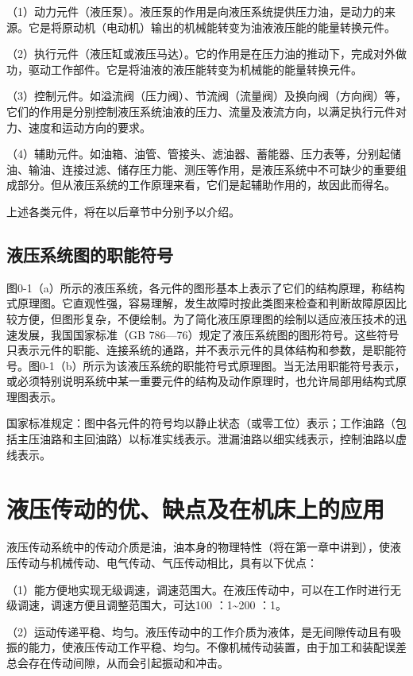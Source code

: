     （1）动力元件（液压泵）。液压泵的作用是向液压系统提供压力油，是动力的来源。它是将原动机（电动机）输出的机械能转变为油液液压能的能量转换元件。

    （2）执行元件（液压缸或液压马达）。它的作用是在压力油的推动下，完成对外做功，驱动工作部件。它是将油液的液压能转变为机械能的能量转换元件。

    （3）控制元件。如溢流阀（压力阀）、节流阀（流量阀）及换向阀（方向阀）等，它们的作用是分别控制液压系统油液的压力、流量及液流方向，以满足执行元件对力、速度和运动方向的要求。

    （4）辅助元件。如油箱、油管、管接头、滤油器、蓄能器、压力表等，分别起储油、输油、连接过滤、储存压力能、测压等作用，是液压系统中不可缺少的重要组成部分。但从液压系统的工作原理来看，它们是起辅助作用的，故因此而得名。

    上述各类元件，将在以后章节中分别予以介绍。

\subsection{液压系统图的职能符号}

    图0-1（a）所示的液压系统，各元件的图形基本上表示了它们的结构原理，称结构式原理图。它直观性强，容易理解，发生故障时按此类图来检查和判断故障原因比较方便，但图形复杂，不便绘制。为了简化液压原理图的绘制以适应液压技术的迅速发展，我国国家标准（GB 786—76）规定了液压系统图的图形符号。这些符号只表示元件的职能、连接系统的通路，并不表示元件的具体结构和参数，是职能符号。图0-1（b）所示为该液压系统的职能符号式原理图。当无法用职能符号表示，或必须特别说明系统中某一重要元件的结构及动作原理时，也允许局部用结构式原理图表示。

    国家标准规定：图中各元件的符号均以静止状态（或零工位）表示；工作油路（包括主压油路和主回油路）以标准实线表示。泄漏油路以细实线表示，控制油路以虚线表示。

\section{液压传动的优、缺点及在机床上的应用}

    液压传动系统中的传动介质是油，油本身的物理特性（将在第一章中讲到），使液压传动与机械传动、电气传动、气压传动相比，具有以下优点：

    （1）能方便地实现无级调速，调速范围大。在液压传动中，可以在工作时进行无级调速，调速方便且调整范围大，可达100 ：1\textasciitilde200 ：1。

    （2）运动传递平稳、均匀。液压传动中的工作介质为液体，是无间隙传动且有吸振的能力，使液压传动工作平稳、均匀。不像机械传动装置，由于加工和装配误差总会存在传动间隙，从而会引起振动和冲击。

